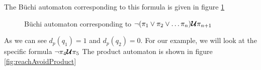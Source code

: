 The B\"{u}chi automaton corresponding to this formula is given in figure \ref{fig:ReachAvoid}

\begin{figure}
\centering
{}
\caption{B\"{u}chi automaton corresponding to $\neg (\pi_1 \lor \pi_2 \lor \dots \pi_n) \bm{\mathcal{U}} \pi_{n+1}$}
\label{fig:ReachAvoid}
\end{figure}

As we can see $d_p(q_1)=1$ and $d_p(q_2)=0$. For our example, we will look at the specific formula $\neg \pi_4 \bm{\mathcal{U}} \pi_5$ The product automaton is shown in figure \ref{fig:reachAvoidProduct}

